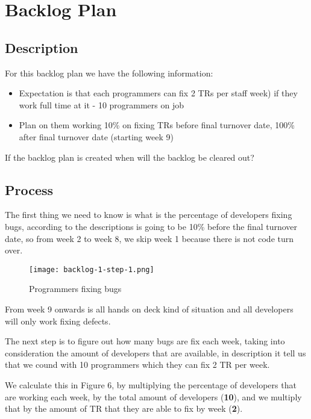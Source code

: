 \section{Backlog Plan}
\subsection{Description}
For this backlog plan we have the following information:
\begin{itemize}
    \item Expectation is that each programmers can fix 2 TRs per staff week) if they work full time at it - 10 programmers on job
    \item Plan on them working 10\% on fixing TRs before final turnover date, 100\% after final turnover date (starting week 9)
\end{itemize}
\noindent
If the backlog plan is created when will the backlog be cleared out?

\subsection{Process}
The first thing we need to know is what is the percentage of developers fixing 
bugs, according to the descriptions is going to be 10\% before the final 
turnover date, so from week 2 to week 8, we skip week 1 because there is not 
code turn over.\newline

\begin{figure}[!htb]
    \centering
    \texttt{[image: backlog-1-step-1.png]}    
    \caption{Programmers fixing bugs}
\end{figure}

\noindent
From week 9 onwards is all hands on deck kind of situation 
and all developers will only work fixing defects. \newline

\noindent
The next step is to figure out how many bugs are fix each week, taking into 
consideration the amount of developers that are available, in description it 
tell us that we cound with 10 programmers which they 
can fix 2 TR per week.\newline

\pagebreak

\noindent
We calculate this in Figure 6, by multiplying the percentage of developers that
are working each week, by the total amount of developers (\textbf{10}), and we multiply that by 
the amount of TR that they are able to fix by week (\textbf{2}).\newline

